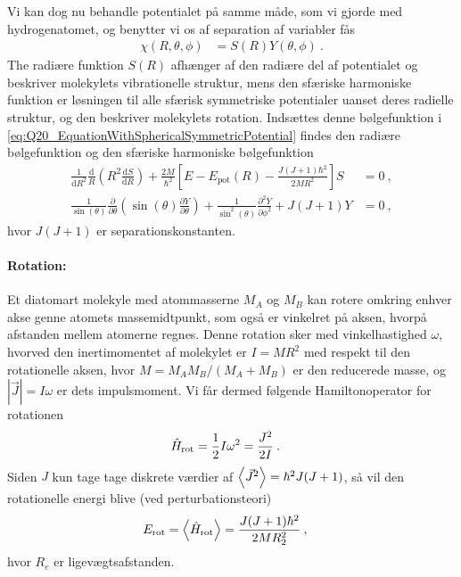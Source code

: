 Vi kan dog nu behandle potentialet på samme måde, som vi gjorde med hydrogenatomet, og benytter vi os af separation af variabler fås
\begin{align}
    \chi(R,\theta,\phi) &= S(R)Y(\theta,\phi) \: .
\end{align}
The radiære funktion $S(R)$ afhænger af den radiære del af potentialet og beskriver molekylets vibrationelle struktur, mens den sfæriske harmoniske funktion er løsningen til alle sfærisk symmetriske potentialer uanset deres radielle struktur, og den beskriver molekylets rotation.
Indsættes denne bølgefunktion i \cref{eq:Q20_EquationWithSphericalSymmetricPotential} findes den radiære bølgefunktion og den sfæriske harmoniske bølgefunktion
\begin{align}
    \frac{1}{\text{d}R^2}\frac{\text{d}}{R}\left(R^2 \frac{\text{d}S}{\text{d}R}\right) + \frac{2M}{\hbar^2}\left[E - E_\text{pot}(R) - \frac{J(J+1)\hbar^2}{2MR^2}\right]S &= 0 \: , \\
    \frac{1}{\sin(\theta)} \frac{\partial}{\partial \theta} \left(\sin(\theta) \frac{\partial Y}{\partial \theta}\right) + \frac{1}{\sin^2(\theta)} \frac{\partial^2 Y}{\partial \phi^2}  + J(J+1)Y &= 0 \: ,
\end{align}
hvor $J(J+1)$ er separationskonstanten.


\paragraph{Rotation:} Et diatomart molekyle med atommasserne $M_A$ og $M_B$ kan rotere omkring enhver akse genne atomets massemidtpunkt, som også er vinkelret på aksen, hvorpå afstanden mellem atomerne regnes. Denne rotation sker med vinkelhastighed $\omega$, hvorved den inertimomentet af molekylet er $I = MR^2$ med respekt til den rotationelle aksen, hvor $M = M_A M_B / (M_A + M_B)$ er den reducerede masse, og $|\Vec{J}| = I \omega$ er dets impulsmoment. Vi får dermed følgende Hamiltonoperator for rotationen
\begin{align}
    \Hat{H}_\text{rot} &= \frac{1}{2} I \omega^2 = \frac{J^2}{2I} \: .
\end{align}
Siden $J$ kun tage tage diskrete værdier af $\Braket{\Vec{J}^2} = \hbar^2 J(J+1)$, så vil den rotationelle energi blive (ved perturbationsteori)
\begin{align}
    E_\text{rot} &= \Braket{\Hat{H}_\text{rot}} = \frac{J(J+1)\hbar^2}{2MR_2^2} \: ,
\end{align}
hvor $R_e$ er ligevægtsafstanden.

